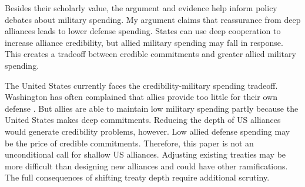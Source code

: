 \documentclass[12pt]{article}
\begin{document}
Besides their scholarly value, the argument and evidence help inform policy debates about military spending. 
My argument claims that reassurance from deep alliances leads to lower defense spending. 
States can use deep cooperation to increase alliance credibility, but allied military spending may fall in response. 
This creates a tradeoff between credible commitments and greater allied military spending. 


The United States currently faces the credibility-military spending tradeoff. 
Washington has often complained that allies provide too little for their own defense \citep{Lanoszka2015}. 
But allies are able to maintain low military spending partly because the United States makes deep commitments. 
Reducing the depth of US alliances would generate credibility problems, however. 
Low allied defense spending may be the price of credible commitments.  
Therefore, this paper is not an unconditional call for shallow US alliances. 
Adjusting existing treaties may be more difficult than designing new alliances and could have other ramifications. 
The full consequences of shifting treaty depth require additional scrutiny. 

 



\singlespace
 
 
\end{document}
